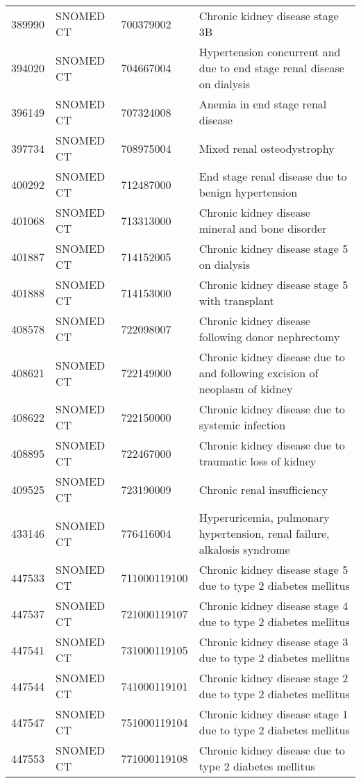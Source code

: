 \begin{table}[ht]
\begin{tabular}{rlll}
  389990 & SNOMED CT & 700379002 & Chronic kidney disease stage 3B \\ 
  394020 & SNOMED CT & 704667004 & Hypertension concurrent and due to end stage renal disease on dialysis \\ 
  396149 & SNOMED CT & 707324008 & Anemia in end stage renal disease \\ 
  397734 & SNOMED CT & 708975004 & Mixed renal osteodystrophy \\ 
  400292 & SNOMED CT & 712487000 & End stage renal disease due to benign hypertension \\ 
  401068 & SNOMED CT & 713313000 & Chronic kidney disease mineral and bone disorder \\ 
  401887 & SNOMED CT & 714152005 & Chronic kidney disease stage 5 on dialysis \\ 
  401888 & SNOMED CT & 714153000 & Chronic kidney disease stage 5 with transplant \\ 
  408578 & SNOMED CT & 722098007 & Chronic kidney disease following donor nephrectomy \\ 
  408621 & SNOMED CT & 722149000 & Chronic kidney disease due to and following excision of neoplasm of kidney \\ 
  408622 & SNOMED CT & 722150000 & Chronic kidney disease due to systemic infection \\ 
  408895 & SNOMED CT & 722467000 & Chronic kidney disease due to traumatic loss of kidney \\ 
  409525 & SNOMED CT & 723190009 & Chronic renal insufficiency \\ 
  433146 & SNOMED CT & 776416004 & Hyperuricemia, pulmonary hypertension, renal failure, alkalosis syndrome \\ 
  447533 & SNOMED CT & 711000119100 & Chronic kidney disease stage 5 due to type 2 diabetes mellitus \\ 
  447537 & SNOMED CT & 721000119107 & Chronic kidney disease stage 4 due to type 2 diabetes mellitus \\ 
  447541 & SNOMED CT & 731000119105 & Chronic kidney disease stage 3 due to type 2 diabetes mellitus \\ 
  447544 & SNOMED CT & 741000119101 & Chronic kidney disease stage 2 due to type 2 diabetes mellitus \\ 
  447547 & SNOMED CT & 751000119104 & Chronic kidney disease stage 1 due to type 2 diabetes mellitus \\ 
  447553 & SNOMED CT & 771000119108 & Chronic kidney disease due to type 2 diabetes mellitus \\ 

\end{tabular}
\end{table}
